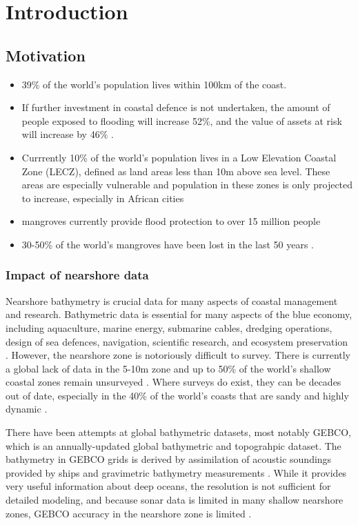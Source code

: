 
\chapter{Introduction}


\section{Motivation}
\begin{itemize}
      \item 39\% of the world's population lives within 100km of the coast.\cite{Magdalena2021}
      \item If further investment in coastal defence is not undertaken, the amount of people exposed to flooding will increase 52\%, and the value of assets at risk will increase by 46\% \cite{Kirezci2020}.
      \item Currrently 10\% of the world's population lives in a Low Elevation Coastal Zone (LECZ), defined as land areas less than 10m above sea level. These areas are especially vulnerable and population in these zones is only projected to increase, especially in African cities \cite{Neumann2015,Lichter2011}
      \item mangroves currently provide flood protection to over 15 million people \cite{Menendez2020}
      \item 30-50\% of the world's mangroves have been lost in the last 50 years \cite{}. 
\end{itemize}
\subsection{Impact of nearshore data}

Nearshore bathymetry is crucial data for many aspects of coastal management and research. Bathymetric data is essential for many aspects of the blue economy, including aquaculture, marine energy, submarine cables, dredging operations, design of sea defences, navigation, scientific research, and ecosystem preservation \cite{Cesbron2021,Ashphaq2021}. However, the nearshore zone is notoriously difficult to survey. There is currently a global lack of data in the 5-10m zone \cite{Albright2021} and up to 50\% of the world's shallow coastal zones remain unsurveyed \cite{IHO/OHI2022}. Where surveys do exist, they can be decades out of date, especially in the 40\% of the world's coasts that are sandy and highly dynamic \cite{Almar2021e}.  

There have been attempts at global bathymetric datasets, most notably GEBCO, which is an annually-updated global bathymetric and topograhpic dataset. The bathymetry in GEBCO grids is derived by assimilation of acoustic soundings provided by ships and gravimetric bathymetry measurements \cite{Cesbron2021}. While it provides very useful information about deep oceans, the resolution is not sufficient for detailed modeling, and because sonar data is limited in many shallow nearshore zones, GEBCO accuracy in the nearshore zone is limited \cite{add}.

